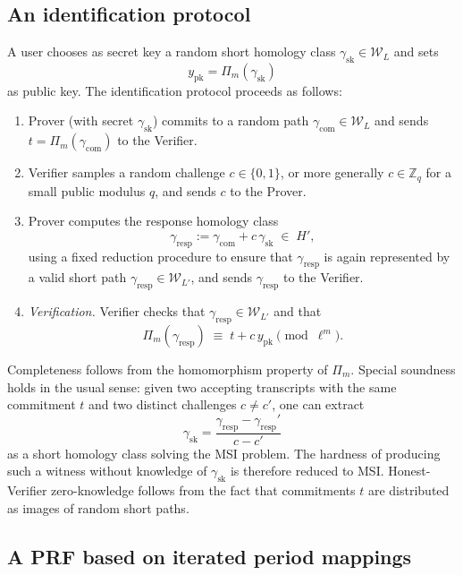 \documentclass[10pt]{amsart}
\theoremstyle{theostyle}
\newcommand{\ZZ}{\mathbb{Z}}
\begin{document}
\subsection{An identification protocol}

A user chooses as secret key a random short homology class
$\gamma_{\mathrm{sk}}\in\mathcal W_L$ and sets
\[
y_{\mathrm{pk}} = \Pi_m(\gamma_{\mathrm{sk}})
\]
as public key. The identification protocol proceeds as follows:

\begin{enumerate}[leftmargin=1.7em]
	\item Prover (with secret $\gamma_{\mathrm{sk}}$) commits to a random
	path $\gamma_{\mathrm{com}}\in \mathcal W_L$ and sends
	$t = \Pi_m(\gamma_{\mathrm{com}})$ to the Verifier.
	
	\item Verifier samples a random challenge
	$c\in\{0,1\}$, or more generally $c\in\ZZ_q$ for a small public modulus $q$,
	and sends $c$ to the Prover.
	
	\item Prover computes the response homology class
	\[
	\gamma_{\mathrm{resp}} := \gamma_{\mathrm{com}} + c\,\gamma_{\mathrm{sk}}
	\;\in\; H',
	\]
	using a fixed reduction procedure to ensure that
	$\gamma_{\mathrm{resp}}$ is again represented by a valid short path
	$\gamma_{\mathrm{resp}}\in\mathcal W_{L'}$, and sends
	$\gamma_{\mathrm{resp}}$ to the Verifier.
	
	\item \emph{Verification.}
Verifier checks that $\gamma_{\mathrm{resp}}\in\mathcal W_{L'}$ and that
	\[
	\Pi_m(\gamma_{\mathrm{resp}})
	\;\equiv\;
	t + c\,y_{\mathrm{pk}}
	\pmod{\ell^m}.
	\]
\end{enumerate}

Completeness follows from the homomorphism property of $\Pi_m$. Special
soundness holds in the usual sense: given two accepting transcripts with the
same commitment $t$ and two distinct challenges $c\neq c'$, one can extract
\[
\gamma_{\mathrm{sk}}
=
\frac{\gamma_{\mathrm{resp}}-\gamma_{\mathrm{resp}}'}{c-c'}
\]
as a short homology class solving the MSI problem. The hardness of producing
such a witness without knowledge of $\gamma_{\mathrm{sk}}$ is therefore
reduced to MSI. Honest-Verifier zero-knowledge follows from the fact that
commitments $t$ are distributed as images of random short paths.

\subsection{A PRF based on iterated period mappings}
\end{document}
